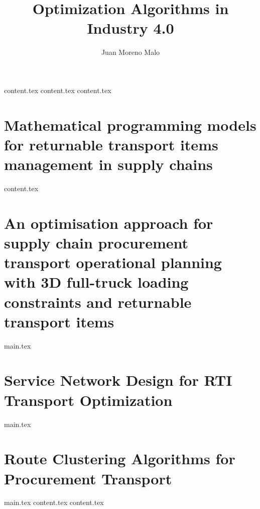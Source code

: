 \documentclass[tesi, crop, rm, english]{configuraciones/editorialupv}
\title{Optimization Algorithms in Industry 4.0}
\author{Juan Moreno Malo}
\begin{document}
\frontmatter
\maketitle
\tableofcontents
\listoffigures

\mainmatter

{content.tex}
{content.tex}
{content.tex}
\chapter{Mathematical programming models for returnable transport items management in supply chains}
{content.tex}
\chapter{An optimisation approach for supply chain procurement transport operational planning with 3D full-truck loading constraints and returnable transport items }
{main.tex}
\chapter{Service Network Design for RTI Transport Optimization }
{main.tex}
\chapter{Route Clustering Algorithms for Procurement Transport }
{main.tex}
{content.tex}
{content.tex}

\printbibliography[heading=bibintoc, title={Bibliography}]
\cleardoublepage
\appendix %

\begingroup
    \renewcommand{\section}[1]{\chapter{#1}}
    
\end{document}
